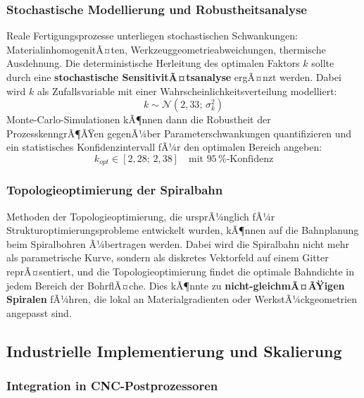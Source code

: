 ﻿\documentclass[12pt,a4paper]{article}
\begin{document}
\subsubsection{Stochastische Modellierung und Robustheitsanalyse}

Reale Fertigungsprozesse unterliegen stochastischen Schwankungen: MaterialinhomogenitÃ¤ten, Werkzeuggeometrieabweichungen, thermische Ausdehnung. Die deterministische Herleitung des optimalen Faktors $k$ sollte durch eine \textbf{stochastische SensitivitÃ¤tsanalyse} ergÃ¤nzt werden. Dabei wird $k$ als Zufallsvariable mit einer Wahrscheinlichkeitsverteilung modelliert:
\begin{equation}
    k \sim \mathcal{N}(2{,}33;\, \sigma_k^2)
\end{equation}
Monte-Carlo-Simulationen kÃ¶nnen dann die Robustheit der ProzesskenngrÃ¶ÃŸen gegenÃ¼ber Parameterschwankungen quantifizieren und ein statistisches Konfidenzintervall fÃ¼r den optimalen Bereich angeben:
\begin{equation}
    k_{opt} \in [2{,}28;\, 2{,}38] \quad \text{mit } 95\,\% \text{-Konfidenz}
\end{equation}

\subsubsection{Topologieoptimierung der Spiralbahn}

Methoden der Topologieoptimierung, die ursprÃ¼nglich fÃ¼r Strukturoptimierungsprobleme entwickelt wurden, kÃ¶nnen auf die Bahnplanung beim Spiralbohren Ã¼bertragen werden. Dabei wird die Spiralbahn nicht mehr als parametrische Kurve, sondern als diskretes Vektorfeld auf einem Gitter reprÃ¤sentiert, und die Topologieoptimierung findet die optimale Bahndichte in jedem Bereich der BohrflÃ¤che. Dies kÃ¶nnte zu \textbf{nicht-gleichmÃ¤ÃŸigen Spiralen} fÃ¼hren, die lokal an Materialgradienten oder WerkstÃ¼ckgeometrien angepasst sind.

\subsection{Industrielle Implementierung und Skalierung}

\subsubsection{Integration in CNC-Postprozessoren}
\end{document}
